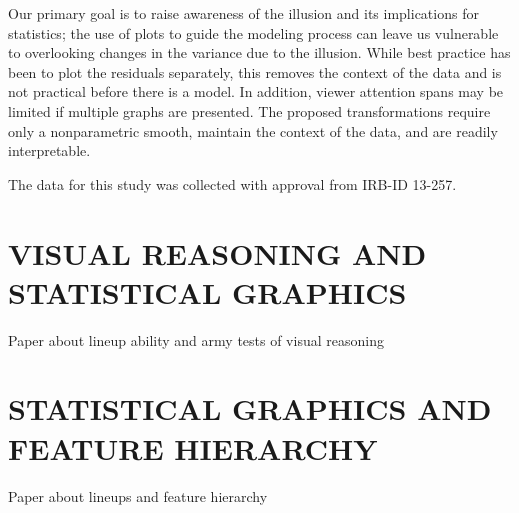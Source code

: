 \documentclass[11pt]{isuthesis}\usepackage[]{graphicx}\usepackage[]{color}
\begin{document}
Our primary goal is to raise awareness of the illusion and its implications for statistics; the use of plots to guide the modeling process can leave us vulnerable to overlooking changes in the variance due to the illusion. While best practice has  been to plot the residuals separately, this removes the context of the data and is not practical before there is a model. In addition, viewer attention spans may be limited if multiple graphs are presented. The proposed transformations require only a nonparametric smooth, maintain the context of the data, and are readily interpretable. 

The data for this study was collected with approval from  IRB-ID 13-257.



\chapter{VISUAL REASONING AND STATISTICAL GRAPHICS}

Paper about lineup ability and army tests of visual reasoning


\chapter{STATISTICAL GRAPHICS AND FEATURE HIERARCHY}

Paper about lineups and feature hierarchy

% 
% 

\end{document}
